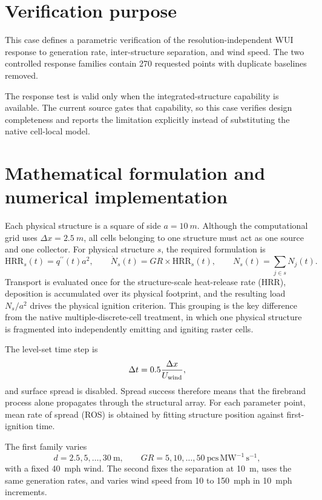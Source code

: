 \section{Verification purpose}

This case defines a parametric verification of the resolution-independent WUI response to generation rate, inter-structure separation, and wind speed. The two controlled response families contain 270 requested points with duplicate baselines removed.

The response test is valid only when the integrated-structure capability is available. The current source gates that capability, so this case verifies design completeness and reports the limitation explicitly instead of substituting the native cell-local model.

\section{Mathematical formulation and numerical implementation}

Each physical structure is a square of side \(a=\SI{10}{m}\). Although the
computational grid uses \(\Delta x=\SI{2.5}{m}\), all cells belonging to one
structure must act as one source and one collector. For physical structure
\(s\), the required formulation is
\[
 \mathrm{HRR}_s(t)=q^{\prime\prime}(t)a^2,
 \qquad \dot N_s(t)=GR\times\mathrm{HRR}_s(t),
 \qquad N_s(t)=\sum_{j\in s}N_j(t).
\]
Transport is evaluated once for the structure-scale heat-release rate (HRR), deposition is
accumulated over its physical footprint, and the resulting load
\(N_s/a^2\) drives the physical ignition criterion. This grouping is the key
difference from the native multiple-discrete-cell treatment, in which one
physical structure is fragmented into independently emitting and igniting
raster cells.

The level-set time step is
\[
 \Delta t=0.5\frac{\Delta x}{U_{\rm wind}},
\]
and surface spread is disabled. Spread success therefore means that the
firebrand process alone propagates through the structural array. For each
parameter point, mean rate of spread (ROS) is obtained by fitting structure position
against first-ignition time.

The first family varies
\[
 d=2.5,5,\ldots,30\ \mathrm{m},
 \qquad GR=5,10,\ldots,50\
 \mathrm{pcs\,MW^{-1}\,s^{-1}},
\]
with a fixed 40~mph wind. The second fixes the separation at 10~m, uses the
same generation rates, and varies wind speed from 10 to 150~mph in 10~mph
increments.

